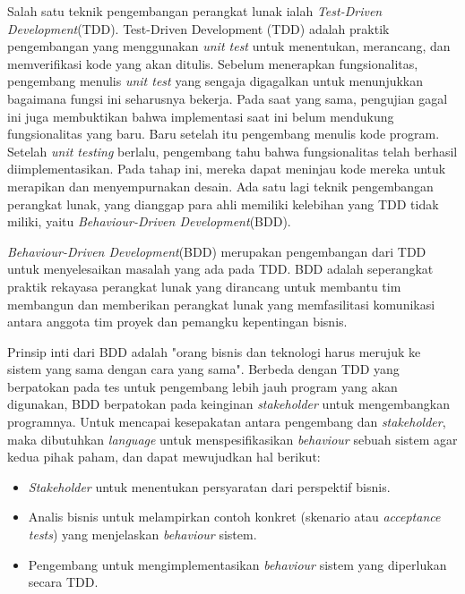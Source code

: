 \documentclass[a4paper,twoside]{article}
\begin{document}
Salah satu teknik pengembangan perangkat lunak ialah \textit{Test-Driven Development}(TDD). Test-Driven Development (TDD) adalah praktik pengembangan yang menggunakan \textit{unit test} untuk menentukan, merancang, dan memverifikasi kode yang akan ditulis. Sebelum menerapkan fungsionalitas, pengembang menulis \textit{unit test} yang sengaja digagalkan untuk menunjukkan bagaimana fungsi ini seharusnya bekerja. Pada saat yang sama, pengujian gagal ini juga membuktikan bahwa implementasi saat ini belum mendukung fungsionalitas yang baru. Baru setelah itu pengembang menulis kode program. Setelah \textit{unit testing} berlalu, pengembang tahu bahwa fungsionalitas telah berhasil diimplementasikan. Pada tahap ini, mereka dapat meninjau kode mereka untuk merapikan dan menyempurnakan desain. Ada satu lagi teknik pengembangan perangkat lunak, yang dianggap para ahli memiliki kelebihan yang TDD tidak miliki, yaitu \textit{Behaviour-Driven Development}(BDD).

\textit{Behaviour-Driven Development}(BDD) merupakan pengembangan dari TDD untuk menyelesaikan masalah yang ada pada TDD. BDD adalah seperangkat praktik rekayasa perangkat lunak yang dirancang untuk membantu tim membangun dan memberikan perangkat lunak yang memfasilitasi komunikasi antara anggota tim proyek dan pemangku kepentingan bisnis.

Prinsip inti dari BDD adalah "orang bisnis dan teknologi harus merujuk ke sistem yang sama dengan cara yang sama". Berbeda dengan TDD yang berpatokan pada tes untuk pengembang lebih jauh program yang akan digunakan, BDD berpatokan pada keinginan \textit{stakeholder} untuk mengembangkan programnya. Untuk mencapai kesepakatan antara pengembang dan \textit{stakeholder}, maka dibutuhkan \textit{language} untuk menspesifikasikan \textit{behaviour} sebuah sistem agar kedua pihak paham, dan dapat mewujudkan hal berikut:
\begin{itemize}
\item \textit{Stakeholder} untuk menentukan persyaratan dari perspektif bisnis.
\item Analis bisnis untuk melampirkan contoh konkret (skenario atau \textit{acceptance tests}) yang menjelaskan \textit{behaviour} sistem.
\item Pengembang untuk mengimplementasikan \textit{behaviour} sistem yang diperlukan secara TDD.
\end{itemize}
	
\end{document}

